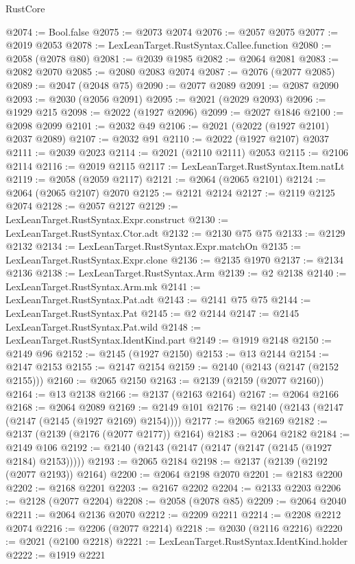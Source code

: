 \begin{lexlean}{RustCore}
\begin{coremodule}
@2074 := Bool.false
@2075 := @2073 @2074
@2076 := @2057 @2075
@2077 := @2019 @2053
@2078 := LexLeanTarget.RustSyntax.Callee.function
@2080 := @2058 (@2078 @80)
@2081 := @2039 @1985
@2082 := @2064 @2081
@2083 := @2082 @2070
@2085 := @2080 @2083 @2074
@2087 := @2076 (@2077 @2085)
@2089 := @2047 (@2048 @75)
@2090 := @2077 @2089
@2091 := @2087 @2090
@2093 := @2030 (@2056 @2091)
@2095 := @2021 (@2029 @2093)
@2096 := @1929 @215
@2098 := @2022 (@1927 @2096)
@2099 := @2027 @1846
@2100 := @2098 @2099
@2101 := @2032 @49
@2106 := @2021 (@2022 (@1927 @2101) @2037 @2089)
@2107 := @2032 @91
@2110 := @2022 (@1927 @2107) @2037
@2111 := @2039 @2023
@2114 := @2021 (@2110 @2111) @2053
@2115 := @2106 @2114
@2116 := @2019 @2115
@2117 := LexLeanTarget.RustSyntax.Item.natLt
@2119 := @2058 (@2059 @2117)
@2121 := @2064 (@2065 @2101)
@2124 := @2064 (@2065 @2107) @2070
@2125 := @2121 @2124
@2127 := @2119 @2125 @2074
@2128 := @2057 @2127
@2129 := LexLeanTarget.RustSyntax.Expr.construct
@2130 := LexLeanTarget.RustSyntax.Ctor.adt
@2132 := @2130 @75 @75
@2133 := @2129 @2132
@2134 := LexLeanTarget.RustSyntax.Expr.matchOn
@2135 := LexLeanTarget.RustSyntax.Expr.clone
@2136 := @2135 @1970
@2137 := @2134 @2136
@2138 := LexLeanTarget.RustSyntax.Arm
@2139 := @2 @2138
@2140 := LexLeanTarget.RustSyntax.Arm.mk
@2141 := LexLeanTarget.RustSyntax.Pat.adt
@2143 := @2141 @75 @75
@2144 := LexLeanTarget.RustSyntax.Pat
@2145 := @2 @2144
@2147 := @2145 LexLeanTarget.RustSyntax.Pat.wild
@2148 := LexLeanTarget.RustSyntax.IdentKind.part
@2149 := @1919 @2148
@2150 := @2149 @96
@2152 := @2145 (@1927 @2150)
@2153 := @13 @2144
@2154 := @2147 @2153
@2155 := @2147 @2154
@2159 := @2140 (@2143 (@2147 (@2152 @2155)))
@2160 := @2065 @2150
@2163 := @2139 (@2159 (@2077 @2160))
@2164 := @13 @2138
@2166 := @2137 (@2163 @2164)
@2167 := @2064 @2166
@2168 := @2064 @2089
@2169 := @2149 @101
@2176 := @2140 (@2143 (@2147 (@2147 (@2145 (@1927 @2169) @2154))))
@2177 := @2065 @2169
@2182 := @2137 (@2139 (@2176 (@2077 @2177)) @2164)
@2183 := @2064 @2182
@2184 := @2149 @106
@2192 := @2140 (@2143 (@2147 (@2147 (@2147 (@2145 (@1927 @2184) @2153)))))
@2193 := @2065 @2184
@2198 := @2137 (@2139 (@2192 (@2077 @2193)) @2164)
@2200 := @2064 @2198 @2070
@2201 := @2183 @2200
@2202 := @2168 @2201
@2203 := @2167 @2202
@2204 := @2133 @2203
@2206 := @2128 (@2077 @2204)
@2208 := @2058 (@2078 @85)
@2209 := @2064 @2040
@2211 := @2064 @2136 @2070
@2212 := @2209 @2211
@2214 := @2208 @2212 @2074
@2216 := @2206 (@2077 @2214)
@2218 := @2030 (@2116 @2216)
@2220 := @2021 (@2100 @2218)
@2221 := LexLeanTarget.RustSyntax.IdentKind.holder
@2222 := @1919 @2221

\end{coremodule}
\end{lexlean}
